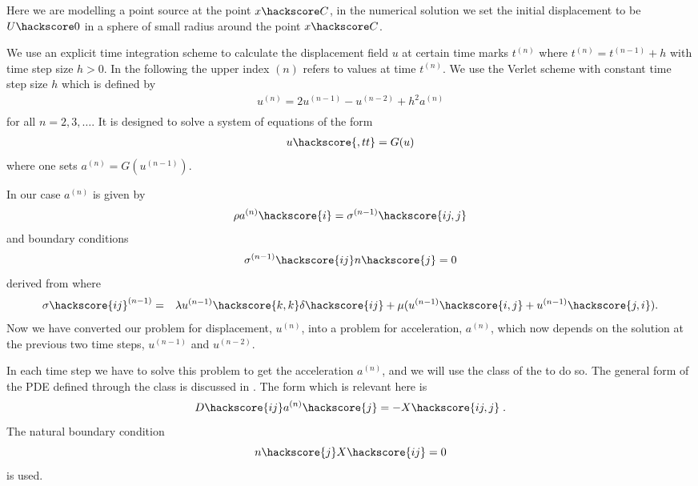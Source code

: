 Here we are modelling a point source at the point $x\hackscore C$, in the numerical solution we
 set the initial displacement to be $U\hackscore 0$ in a sphere of small radius around the point
 $x\hackscore C$.  

We use an explicit time integration scheme to calculate the displacement field $u$ at 
certain time marks $t^{(n)}$ where $t^{(n)}=t^{(n-1)}+h$ with time step size $h>0$. In the following the upper index ${(n)}$ refers to values at time $t^{(n)}$. We use the Verlet scheme  with constant time step size $h$
which is defined by
\begin{eqnarray} \label{WAVE dyn 2}
u^{(n)}=2u^{(n-1)}-u^{(n-2)} + h^2 a^{(n)} \\
\end{eqnarray}
for all $n=2,3,\ldots$. It is designed to solve a system of equations of the form
\begin{eqnarray} \label{WAVE dyn 2b} 
u\hackscore{,tt}=G(u)
\end{eqnarray}
where one sets $a^{(n)}=G(u^{(n-1)})$.

In our case $a^{(n)}$ is given by
\begin{eqnarray}\label{WAVE dyn 3}
\rho a^{(n)}\hackscore{i}=\sigma^{(n-1)}\hackscore{ij,j}
\end{eqnarray}
and boundary conditions
\begin{eqnarray} \label{WAVE natural at n}
\sigma^{(n-1)}\hackscore{ij}n\hackscore{j}=0
\end{eqnarray}
derived from  where 
\begin{eqnarray} \label{WAVE dyn 3a}
\sigma\hackscore{ij}^{(n-1)} & = & \lambda u^{(n-1)}\hackscore{k,k} \delta\hackscore{ij} + \mu ( u^{(n-1)}\hackscore{i,j} + u^{(n-1)}\hackscore{j,i}).
\end{eqnarray}
Now we have converted our problem for displacement, $u^{(n)}$, into a problem for 
acceleration, $a^(n)$, which now depends 
on the solution at the previous two time steps, $u^{(n-1)}$  and $u^{(n-2)}$.

In each time step we have to solve this problem to get the acceleration $a^{(n)}$, and we will
use the \LinearPDE class of the \linearPDEs to do so. The general form of the PDE defined through
the \LinearPDE class is discussed in . The form which is relevant here is
\begin{equation}\label{WAVE dyn 100}
D\hackscore{ij} a^{(n)}\hackscore{j} = - X\hackscore{ij,j}\; .
\end{equation}
The natural boundary condition
\begin{equation}\label{WAVE dyn 101}
n\hackscore{j}X\hackscore{ij} =0 
\end{equation}
is used. 

